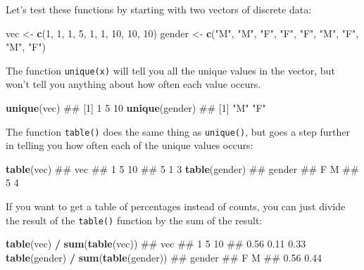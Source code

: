 \documentclass[]{book}
\newenvironment{Shaded}{\begin{snugshade}}{\end{snugshade}}
\newcommand{\KeywordTok}[1]{\textcolor[rgb]{0.13,0.29,0.53}{\textbf{#1}}}
\newcommand{\DecValTok}[1]{\textcolor[rgb]{0.00,0.00,0.81}{#1}}
\newcommand{\StringTok}[1]{\textcolor[rgb]{0.31,0.60,0.02}{#1}}
\newcommand{\OperatorTok}[1]{\textcolor[rgb]{0.81,0.36,0.00}{\textbf{#1}}}
\newcommand{\NormalTok}[1]{#1}
\theoremstyle{definition}
\theoremstyle{definition}
\theoremstyle{remark}
\begin{document}
Let's test these functions by starting with two vectors of discrete
data:

\begin{Shaded}
\begin{Highlighting}[]
\NormalTok{vec <-}\StringTok{ }\KeywordTok{c}\NormalTok{(}\DecValTok{1}\NormalTok{, }\DecValTok{1}\NormalTok{, }\DecValTok{1}\NormalTok{, }\DecValTok{5}\NormalTok{, }\DecValTok{1}\NormalTok{, }\DecValTok{1}\NormalTok{, }\DecValTok{10}\NormalTok{, }\DecValTok{10}\NormalTok{, }\DecValTok{10}\NormalTok{)}
\NormalTok{gender <-}\StringTok{ }\KeywordTok{c}\NormalTok{(}\StringTok{"M"}\NormalTok{, }\StringTok{"M"}\NormalTok{, }\StringTok{"F"}\NormalTok{, }\StringTok{"F"}\NormalTok{, }\StringTok{"F"}\NormalTok{, }\StringTok{"M"}\NormalTok{, }\StringTok{"F"}\NormalTok{, }\StringTok{"M"}\NormalTok{, }\StringTok{"F"}\NormalTok{)}
\end{Highlighting}
\end{Shaded}

The function \texttt{unique(x)} will tell you all the unique values in
the vector, but won't tell you anything about how often each value
occurs.

\begin{Shaded}
\begin{Highlighting}[]
\KeywordTok{unique}\NormalTok{(vec)}
\NormalTok{## [1]  1  5 10}
\KeywordTok{unique}\NormalTok{(gender)}
\NormalTok{## [1] "M" "F"}
\end{Highlighting}
\end{Shaded}

The function \texttt{table()} does the same thing as \texttt{unique()},
but goes a step further in telling you how often each of the unique
values occurs:

\begin{Shaded}
\begin{Highlighting}[]
\KeywordTok{table}\NormalTok{(vec)}
\NormalTok{## vec}
\NormalTok{##  1  5 10 }
\NormalTok{##  5  1  3}
\KeywordTok{table}\NormalTok{(gender)}
\NormalTok{## gender}
\NormalTok{## F M }
\NormalTok{## 5 4}
\end{Highlighting}
\end{Shaded}

If you want to get a table of percentages instead of counts, you can
just divide the result of the \texttt{table()} function by the sum of
the result:

\begin{Shaded}
\begin{Highlighting}[]
\KeywordTok{table}\NormalTok{(vec) }\OperatorTok{/}\StringTok{ }\KeywordTok{sum}\NormalTok{(}\KeywordTok{table}\NormalTok{(vec))}
\NormalTok{## vec}
\NormalTok{##    1    5   10 }
\NormalTok{## 0.56 0.11 0.33}
\KeywordTok{table}\NormalTok{(gender) }\OperatorTok{/}\StringTok{ }\KeywordTok{sum}\NormalTok{(}\KeywordTok{table}\NormalTok{(gender))}
\NormalTok{## gender}
\NormalTok{##    F    M }
\NormalTok{## 0.56 0.44}
\end{Highlighting}
\end{Shaded}
\end{document}
